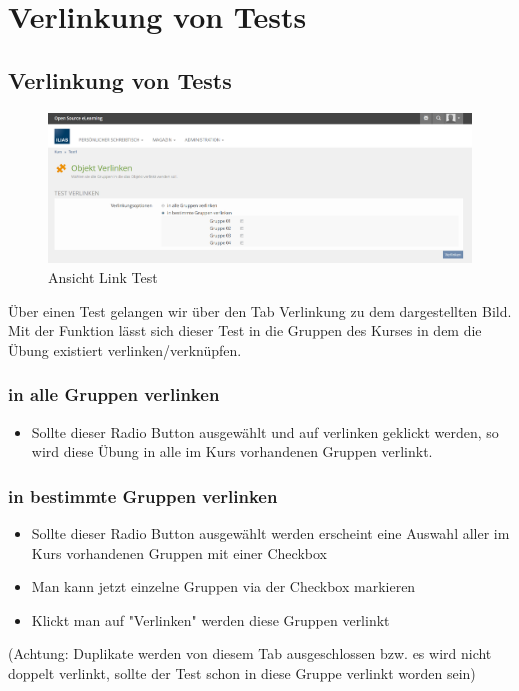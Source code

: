 \chapter{Verlinkung von Tests}\label{linkTest}
\minitoc
\clearpage

\section{Verlinkung von Tests}
\begin{figure}
	\centering
	\includegraphics[width=1\textwidth]{img/linkTest.png}
	\caption{Ansicht Link Test}
\end{figure}

Über einen Test gelangen wir über den Tab Verlinkung zu dem dargestellten Bild. 
Mit der Funktion lässt sich dieser Test in die Gruppen des Kurses in dem die Übung existiert verlinken/verknüpfen. 

\subsection*{in alle Gruppen verlinken}
\begin{itemize}
	\item Sollte dieser Radio Button ausgewählt und auf verlinken geklickt werden, so wird diese Übung in alle im Kurs vorhandenen Gruppen verlinkt. 
\end{itemize}

\subsection*{in bestimmte Gruppen verlinken}
\begin{itemize}
	\item Sollte dieser Radio Button ausgewählt werden erscheint eine Auswahl aller im Kurs vorhandenen Gruppen mit einer Checkbox
	\item Man kann jetzt einzelne Gruppen via der Checkbox markieren
	\item Klickt man auf "Verlinken" werden diese Gruppen verlinkt
\end{itemize}

(Achtung: Duplikate werden von diesem Tab ausgeschlossen bzw. es wird nicht doppelt verlinkt, sollte der Test schon in diese Gruppe verlinkt worden sein) 
\clearpage